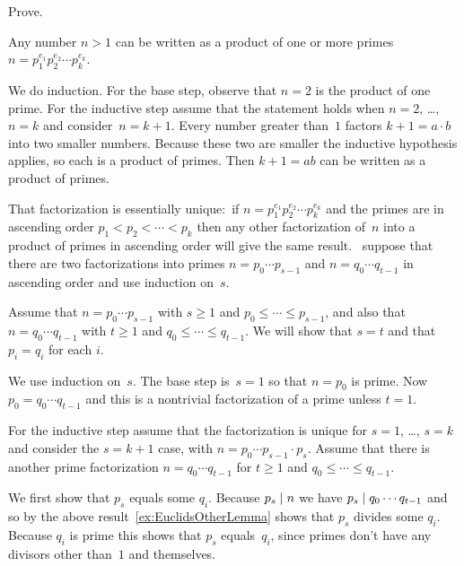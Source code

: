 \documentclass{ibl}  %
\begin{document}
\begin{problem}   
Prove.
\begin{exes}
\begin{exercise} 
  Any number $n>1$ can be written as a product of one or more primes
  $n=p_1^{e_1}p_2^{e_2}\cdots p_k^{e_k}$.
\end{exercise}
\begin{answer}
  We do induction.
  For the base step, observe that $n=2$ is the product of one prime. 
  For the inductive step assume that the statement holds when $n=2$, \ldots, 
  $n=k$ and consider~$n=k+1$.
  Every number greater than~$1$ factors $k+1=a\cdot b$ into two smaller
  numbers.
  Because these two are smaller
  the inductive hypothesis applies, so each is a product of 
  primes.
  Then $k+1=ab$ can be written as a product of primes.  
\end{answer}
\begin{exercise} 
  That factorization is essentially unique:~if 
  $n=p_1^{e_1}p_2^{e_2}\cdots p_k^{e_k}$ and the primes
  are in ascending order $p_1<p_2<\cdots<p_k$ then any other
  factorization of~$n$ into a product of primes in ascending order will give the
  same result. 
  \hint~suppose that there are two factorizations into primes 
   $n=p_0\cdots p_{s-1}$ and $n=q_0\cdots q_{t-1}$ in ascending order 
   and use induction on~$s$.
\end{exercise}
\begin{answer}
  Assume that $n=p_0\cdots p_{s-1}$ with $s\geq 1$ and
  $p_0\leq\cdots \leq p_{s-1}$, 
  and also that $n=q_0\cdots q_{t-1}$ with $t\geq 1$ 
  and $q_0\leq\cdots \leq q_{t-1}$.
  We will show that $s=t$ and that $p_i=q_i$ for each $i$.

  We use induction on~$s$.
  The base step is~$s=1$ so that $n=p_0$ is prime.
  Now $p_0=q_0\cdots q_{t-1}$ and this is a nontrivial factorization of a prime
  unless $t=1$.

  For the inductive step assume that the factorization is unique for
  $s=1$, \ldots, $s=k$ and consider the $s=k+1$ case, with
  $n=p_0\cdots p_{s-1}\cdot p_s$.   
  Assume that there is another prime factorization $n=q_0\cdots q_{t-1}$
  for $t\geq 1$ and $q_0\leq\cdots \leq q_{t-1}$.

  We first show that $p_s$ equals some $q_i$.
  Because $p_s\mid n$ we have $p_s\mid q_0\cdots q_{t-1}$ and so
  by the above result~\ref{ex:EuclidsOtherLemma} shows that
  $p_s$ divides some $q_i$.
  Because $q_i$ is prime this shows that $p_s$ equals~$q_i$,
  since primes don't have any divisors other than~$1$ and themselves.


\end{answer}
\end{exes}
\end{problem}
\end{document}
